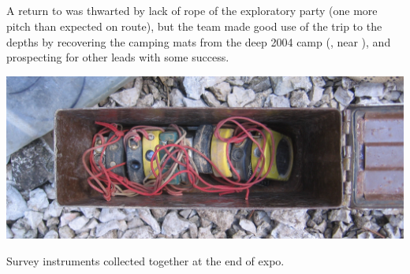 \subsection{}

A return to  was thwarted by lack of rope of the exploratory party (one more pitch than expected on route), but the team made good use of the trip to the depths by recovering the camping mats from the deep 2004 camp (, near ), and prospecting for other leads with some success.


\begin{pagefigure}
\checkoddpage \ifoddpage \forcerectofloat \else \forceversofloat \fi
   \centering
\includegraphics[width = \textwidth]{2010/expo_findings/20100811-12-17-38 - Jarvist Frost A520 - IMG_0041 - survey instruments.jpg}
\caption{Survey instruments collected together at the end of expo. } \label{ammo tin instruments}
\end{pagefigure}
